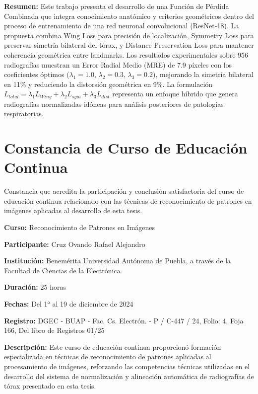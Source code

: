 \textbf{Resumen:} Este trabajo presenta el desarrollo de una Función de Pérdida Combinada que integra conocimiento anatómico y criterios geométricos dentro del proceso de entrenamiento de una red neuronal convolucional (ResNet-18). La propuesta combina Wing Loss para precisión de localización, Symmetry Loss para preservar simetría bilateral del tórax, y Distance Preservation Loss para mantener coherencia geométrica entre landmarks. Los resultados experimentales sobre 956 radiografías muestran un Error Radial Medio (MRE) de 7.9 píxeles con los coeficientes óptimos ($\lambda_1 = 1.0$, $\lambda_2 = 0.3$, $\lambda_3 = 0.2$), mejorando la simetría bilateral en 11\% y reduciendo la distorsión geométrica en 9\%. La formulación $L_{total} = \lambda_1 L_{Wing} + \lambda_2 L_{sym} + \lambda_3 L_{dist}$ representa un enfoque híbrido que genera radiografías normalizadas idóneas para análisis posteriores de patologías respiratorias.



\section{Constancia de Curso de Educación Continua}

Constancia que acredita la participación y conclusión satisfactoria del curso de educación continua relacionado con las técnicas de reconocimiento de patrones en imágenes aplicadas al desarrollo de esta tesis.

\textbf{Curso:} Reconocimiento de Patrones en Imágenes

\textbf{Participante:} Cruz Ovando Rafael Alejandro

\textbf{Institución:} Benemérita Universidad Autónoma de Puebla, a través de la Facultad de Ciencias de la Electrónica

\textbf{Duración:} 25 horas

\textbf{Fechas:} Del 1° al 19 de diciembre de 2024

\textbf{Registro:} DGEC - BUAP - Fac. Cs. Electrón. - P / C-447 / 24, Folio: 4, Foja 166, Del libro de Registros 01/25


\textbf{Descripción:} Este curso de educación continua proporcionó formación especializada en técnicas de reconocimiento de patrones aplicadas al procesamiento de imágenes, reforzando las competencias técnicas utilizadas en el desarrollo del sistema de normalización y alineación automática de radiografías de tórax presentado en esta tesis.

